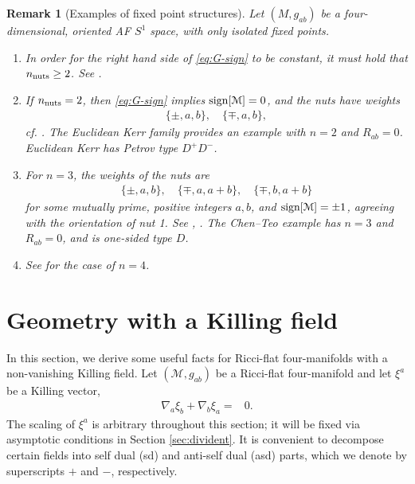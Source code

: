 \documentclass[a4paper,11pt,reqno]{amsart}
\newcommand{\sign}{\mathop{\rm sign}}
\newcommand{\cM}{\mathcal{M}}
\theoremstyle{plain}
\newtheorem{remark}[thm]{Remark}
\newcommand{\nnuts}{n_{\text{\rm nuts}}}
\numberwithin{equation}{section}
\begin{document}
\begin{remark}[Examples of fixed point structures]
\label{rem:nutfacts} 
Let $(M, g_{ab})$ be a four-dim\-en\-sional, oriented AF $S^1$ space, with only isolated fixed points. 
%
\begin{enumerate} 
\item In order for the right hand side of \eqref{eq:G-sign} to be constant, it must hold that $\nnuts \geq 2$. See \cite[Remark 3.2]{MR3343967}. 
\item \label{point:2nut} 
If $\nnuts=2$, then \eqref{eq:G-sign} implies $\sign[\cM]=0$, and the nuts have weights 
\begin{align}
\{\pm, a, b\}, \quad  \{\mp,a,b\},
\end{align} 
cf. \cite[Remark 3.4]{MR3343967}.
The Euclidean Kerr family provides an example with $n=2$ and $R_{ab} = 0$. Euclidean Kerr has Petrov type $D^+D^-$. 
\item \label{point:3nut} 
For $n=3$, the weights of the nuts are 
\begin{align} 
\{\pm, a,b\} , \quad \{\mp, a, a+b\}, \quad \{ \mp, b, a+b\}
\end{align} 
for some mutually prime, positive integers $a,b$, and $\sign[\cM] = \pm 1$, agreeing with the orientation of nut 1. See \cite[Theorem 1.8]{MR3343967}, \cite[Theorem 7.1]{2018JGP...133..181J}. The Chen--Teo example \cite{2011PhLB..703..359C} has $n=3$ and $R_{ab} = 0$, and is one-sided type $D$.
\item See \cite[Theorem 7.2]{2018JGP...133..181J} for the case of $n=4$.  
%
\end{enumerate} 
\end{remark}

\section{Geometry with a Killing field}\label{sec:S1inst} 

In this section, we derive some useful facts for Ricci-flat four-manifolds with a non-vanishing Killing field. 
Let $(\cM, g_{ab})$ be a Ricci-flat four-manifold and let 
$\xi^a$ be a Killing vector,
\begin{align}
\nabla_{a}\xi_{b} + \nabla_{b}\xi_{a}={}&0.
\end{align}
The scaling of $\xi^a$ is arbitrary throughout this section; it will be fixed via  asymptotic conditions in Section \ref{sec:divident}. 
It is convenient to decompose certain fields into self dual (sd) and anti-self dual (asd) parts, which we denote by superscripts $+$ and $-$, respectively.
\end{document}
